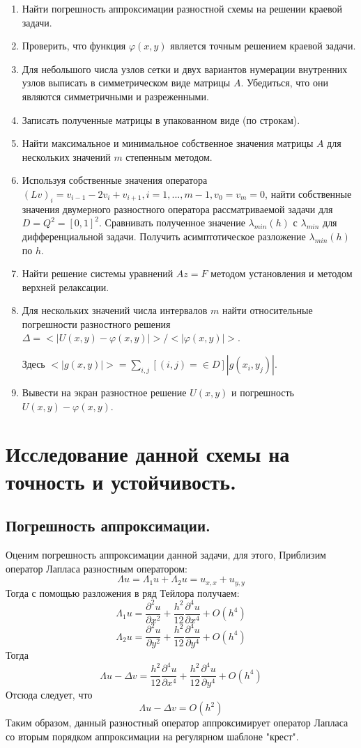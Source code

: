 \documentclass[12pt,a4paper]{scrartcl}
\begin{document}
\begin{enumerate}
    \item Найти погрешность аппроксимации разностной схемы на решении краевой задачи.
    \item Проверить, что функция $  \varphi(x,y)$ является точным решением краевой задачи.
    \item Для небольшого числа узлов сетки и двух вариантов нумерации внутренних узлов выписать в симметрическом виде матрицы $A$. Убедиться, что они являются симметричными и разреженными.
    \item Записать полученные матрицы в упакованном виде (по строкам).
    \item Найти максимальное и минимальное собственное значения матрицы $A$ для нескольких значений $m$ степенным методом.
    \item Используя собственные значения оператора $(Lv)_i=v_{i-1}-2v_i+v_{i+1},i=1,...,m-1, v_0=v_m=0$, найти собственные значения двумерного разностного оператора рассматриваемой задачи для $D=Q^2=[0,1]^2$. Сравнивать полученное значение $\lambda_{min}(h)$ с $\lambda_{min}$ для дифференциальной задачи. Получить асимптотическое разложение $\lambda_{min}(h)$ по $h$.
    \item Найти решение системы уравнений $Az=F$ методом установления и методом верхней релаксации.
    \item Для нескольких значений числа интервалов $m$ найти относительные погрешности разностного решения $	\Delta=<|U(x,y)-\varphi(x,y)|>/<|\varphi(x,y)|>.$
    
    Здесь $<|g(x,y)|>=\sum_{i,j}[(i,j)=\in D]|g(x_i,y_j)|.$
    \item Вывести на экран разностное решение $U(x,y)$ и погрешность $U(x,y)-\varphi(x,y)$.
    
\end{enumerate}

\section{Исследование данной схемы на точность и устойчивость.}

    \subsection{Погрешность аппроксимации.}
    Оценим погрешность аппроксимации данной задачи, для этого, Приблизим оператор Лапласа разностным оператором:
    \[
        \Lambda u = \Lambda_1 u + \Lambda_2 u = u_{x,x}+u_{y,y}
    \]
    Тогда с помощью разложения в ряд Тейлора получаем:
    \[
        \Lambda_1 u = {\dfrac{{\partial}^2 u}{\partial x^{2}}}+\dfrac{h^2}{12}{\dfrac{{\partial}^4 u}{\partial x^{4}}}+O(h^4)
    \]
    \[
         \Lambda_2 u = {\dfrac{{\partial}^2 u}{\partial y^{2}}}+\dfrac{h^2}{12}{\dfrac{{\partial}^4 u}{\partial y^{4}}}+O(h^4)
    \]
    Тогда
    \[
        \Lambda u - \Delta v = \dfrac{h^2}{12}{\dfrac{{\partial}^4 u}{\partial x^{4}}}+\dfrac{h^2}{12}{\dfrac{{\partial}^4 u}{\partial y^{4}}}+O(h^4)
    \]
    Отсюда следует, что
    \[
        \Lambda u - \Delta v = O(h^2)
    \]
    Таким образом, данный разностный оператор аппроксимирует оператор Лапласа со  вторым порядком аппроксимации на регулярном шаблоне "крест". 
    
\end{document}
